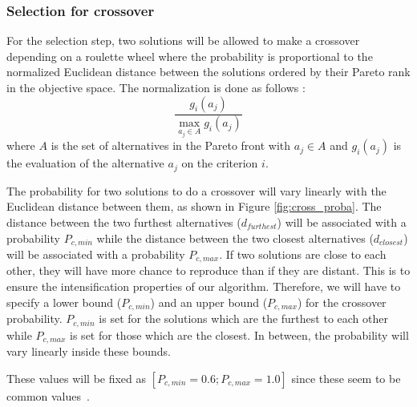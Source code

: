 \subsubsection{Selection for crossover}
For the selection step, two solutions will be allowed to make a crossover depending on a roulette wheel where the probability is proportional to the normalized Euclidean distance between the solutions ordered by their Pareto rank in the objective space. The normalization is done as follows :
\begin{equation}
\frac{g_i(a_j)}{\max\limits_{a_j \in A} g_i(a_j)}
\end{equation}
where $A$ is the set of alternatives in the Pareto front with $a_j \in A$ and $g_i(a_j)$ is the evaluation of the alternative $a_j$ on the criterion $i$.


The probability for two solutions to do a crossover will vary linearly with the Euclidean distance between them, as shown in Figure \ref{fig:cross_proba}. The distance between the two furthest alternatives ($d_{furthest}$) will be associated with a probability $P_{c, min}$ while the distance between the two closest alternatives ($d_{closest}$) will be associated with a probability $P_{c, max}$. If two solutions are close to each other, they will have more chance to reproduce than if they are distant. This is to ensure the intensification properties of our algorithm. Therefore, we will have to specify a lower bound ($P_{c, min}$) and an upper bound ($P_{c, max}$) for the crossover probability. $P_{c, min}$ is set for the solutions which are the furthest to each other while $P_{c, max}$ is set for those which are the closest. In between, the probability will vary linearly inside these bounds.

These values will be fixed as $[P_{c, min} = 0.6; P_{c, max} = 1.0]$ since these seem to be common values~\cite{Davis1989}.

